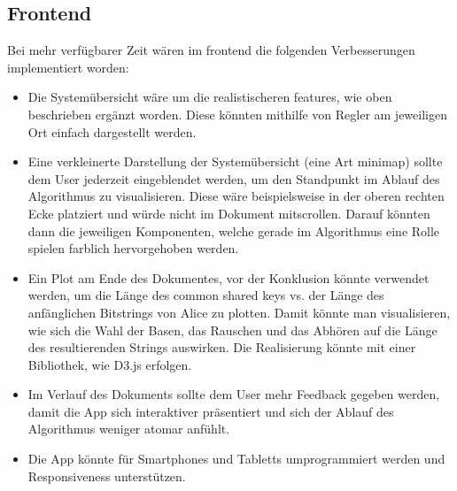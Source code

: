\documentclass[a4paper,10.2pt,pdftex]{scrartcl}%
\begin{document}
\subsection{Frontend}
Bei mehr verfügbarer Zeit wären im frontend die folgenden Verbesserungen implementiert worden:
\begin{itemize}
\item Die Systemübersicht wäre um die realistischeren features, wie oben beschrieben ergänzt worden. Diese könnten mithilfe von Regler am jeweiligen Ort einfach dargestellt werden.
\item Eine verkleinerte Darstellung der Systemübersicht (eine Art minimap) sollte dem User jederzeit eingeblendet werden, um den Standpunkt im Ablauf des Algorithmus zu visualisieren. Diese wäre beispielsweise in der oberen rechten Ecke platziert und würde nicht im Dokument mitscrollen. Darauf könnten dann die jeweiligen Komponenten, welche gerade im Algorithmus eine Rolle spielen farblich hervorgehoben werden.
\item Ein Plot am Ende des Dokumentes, vor der Konklusion könnte verwendet werden, um die Länge des common shared keys vs. der Länge des anfänglichen Bitstrings von Alice zu plotten. Damit könnte man visualisieren, wie sich die Wahl der Basen, das Rauschen und das Abhören auf die Länge des resultierenden Strings auswirken. Die Realisierung könnte mit einer Bibliothek, wie D3.js erfolgen.
\item Im Verlauf des Dokuments sollte dem User mehr Feedback gegeben werden, damit die App sich interaktiver präsentiert und sich der Ablauf des Algorithmus weniger atomar anfühlt.
\item Die App könnte für Smartphones und Tabletts umprogrammiert werden und Responsiveness unterstützen.
\end{itemize}
\newpage
\appendix


\nocite{*}	

 
\listoffigures
\listoftables


\end{document}
